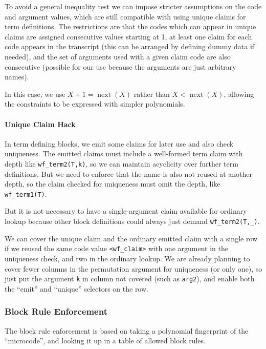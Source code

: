 \documentclass{article}
\theoremstyle{plain}
\theoremstyle{definition}
\begin{document}
To avoid a general inequality test we can impose stricter assumptions
on the code and argument values, which are still compatible with using
unique claims for term definitions. The restrictions are that the codes
which can appear in unique claims are assigned consecutive values
starting at 1, at least one claim for each code appears in the
transcript (this can be arranged by defining dummy data if needed), and
the set of arguments used with a given claim code are also consecutive
(possible for our use because the arguments are just arbitrary names).

In this case, we use $X+1 = \operatorname{next}(X)$ rather than
$X < \operatorname{next}(X)$, allowing the constraints to be expressed
with simpler polynomials.


\paragraph{Unique Claim Hack\\}\label{unique-claim-hack}

In term defining blocks, we emit some claims for later use and also check
uniqueness. The emitted claims must include a well-formed term claim
with depth like \texttt{wf\_term2(T,k)}, so we can maintain acyclicity
over further term definitions. But we need to enforce that the name is
also not reused at another depth, so the claim checked for uniqueness
must omit the depth, like \texttt{wf\_term1(T)}.

But it is not necessary to have a single-argument claim available for
ordinary lookup because other block definitions could always just demand
\texttt{wf\_term2(T,\_)}.

We can cover the unique claim and the ordinary emitted claim with a
single row if we reused the same code value
\texttt{\textless{}wf\_claim\textgreater{}} with one argument in the
uniqueness check, and two in the ordinary lookup. We are already
planning to cover fewer columns in the permutation argument for
uniqueness (or only one), so just put the argument \texttt{k} in column
not covered (such as \texttt{arg2}), and enable both the ``emit'' and
``unique'' selectors on the row.

\subsubsection{Block Rule Enforcement}\label{block-rule-enforcement}

The block rule enforcement is based on taking a polynomial fingerprint
of the ``microcode'', and looking it up in a table of allowed block rules.
\end{document}
